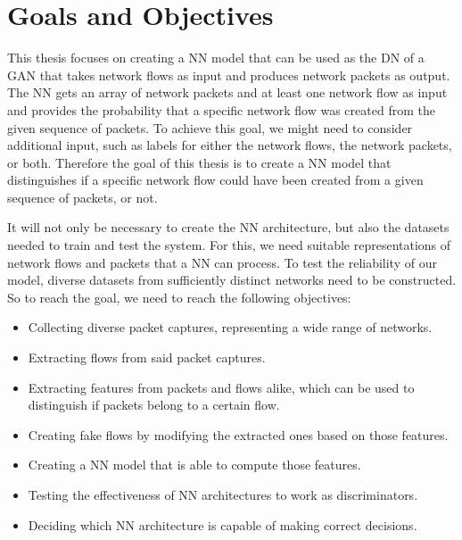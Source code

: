\documentclass[
	ngerman,
	ruledheaders=section,%
	class=report,%
	thesis={type=bachelor},%
	accentcolor=9c,%
	custommargins=true,%
	marginpar=false,%
	parskip=half-,%
	fontsize=11pt,%
]{tudapub}
\begin{document}
\section{Goals and Objectives}



This thesis focuses on creating a NN model
that can be used as the DN of a GAN
that takes network flows as input and produces network packets as output.
The NN gets an array of network packets and at least one network flow as input
and provides the probability that a specific network flow was created from the given sequence of packets.
To achieve this goal, we might need to consider additional input,
such as labels for either the network flows, the network packets, or both.
Therefore the goal of this thesis is to create a NN model that distinguishes
if a specific network flow could have been created from a given sequence of packets, or not.

It will not only be necessary to create the NN architecture,
but also the datasets needed to train and test the system.
For this, we need suitable representations of network flows and packets that a NN can process.
To test the reliability of our model, diverse datasets from sufficiently distinct networks need to be constructed.
So to reach the goal, we need to reach the following objectives:

\begin{itemize}
  \item Collecting diverse packet captures, representing a wide range of networks.
  \item Extracting flows from said packet captures.
  \item Extracting features from packets and flows alike,
which can be used to distinguish if packets belong to a certain flow.
  \item Creating fake flows by modifying the extracted ones based on those features.
  \item Creating a NN model that is able to compute those features.
  \item Testing the effectiveness of NN architectures to work as discriminators.
  \item Deciding which NN architecture is capable of making correct decisions.
\end{itemize}
\end{document}
